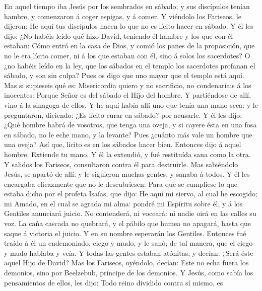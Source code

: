  En aquel tiempo iba Jesús por los sembrados en sábado; y
sus discípulos tenían hambre, y comenzaron á coger espigas, y á comer.
 Y viéndolo los Fariseos, le dijeron: He aquí tus discípulos
hacen lo que no es lícito hacer en sábado.  Y él les dijo:
¿No habéis leído qué hizo David, teniendo él hambre y los que con él
estaban:  Cómo entró en la casa de Dios, y comió los panes
de la proposición, que no le era lícito comer, ni á los que estaban con
él, sino á solos los sacerdotes?  O ¿no habéis leído en la
ley, que los sábados en el templo los sacerdotes profanan el sábado, y
son sin culpa?  Pues os digo que uno mayor que el templo
está aquí.  Mas si supieseis qué es: Misericordia quiero y
no sacrificio, no condenaríais á los inocentes:  Porque
Señor es del sábado el Hijo del hombre.  Y partiéndose de
allí, vino á la sinagoga de ellos.  Y he aquí había allí
uno que tenía una mano seca: y le preguntaron, diciendo: ¿Es lícito
curar en sábado? por acusarle.  Y él les dijo: ¿Qué hombre
habrá de vosotros, que tenga una oveja, y si cayere ésta en una fosa en
sábado, no le eche mano, y la levante?  Pues ¿cuánto más
vale un hombre que una oveja? Así que, lícito es en los sábados hacer
bien.  Entonces dijo á aquel hombre: Extiende tu mano. Y él
la extendió, y fué restituída sana como la otra.  Y salidos
los Fariseos, consultaron contra él para destruirle.  Mas
sabiéndolo Jesús, se apartó de allí: y le siguieron muchas gentes, y
sanaba á todos.  Y él les encargaba eficazmente que no le
descubriesen:  Para que se cumpliese lo que estaba dicho
por el profeta Isaías, que dijo:  He aquí mi siervo, al
cual he escogido; mi Amado, en el cual se agrada mi alma: pondré mi
Espíritu sobre él, y á los Gentiles anunciará juicio.  No
contenderá, ni voceará: ni nadie oirá en las calles su voz.
 La caña cascada no quebrará, y el pábilo que humea no
apagará, hasta que saque á victoria el juicio.  Y en su
nombre esperarán los Gentiles.  Entonces fué traído á él un
endemoniado, ciego y mudo, y le sanó; de tal manera, que el ciego y mudo
hablaba y veía.  Y todas las gentes estaban atónitas, y
decían: ¿Será éste aquel Hijo de David?  Mas los Fariseos,
oyéndolo, decían: Este no echa fuera los demonios, sino por Beelzebub,
príncipe de los demonios.  Y Jesús, como sabía los
pensamientos de ellos, les dijo: Todo reino dividido contra sí mismo, es
